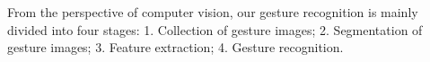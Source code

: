 \documentclass[10pt,twocolumn,letterpaper]{article}
\begin{document}

From the perspective of computer vision, our gesture recognition is mainly divided into four stages: 1. Collection of gesture images; 2. Segmentation of gesture images; 3. Feature extraction; 4. Gesture recognition.
\end{document}
